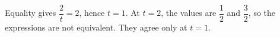 Equality gives $\dfrac{2}{t}=2$, hence $t=1$. At $t=2$, the values are $\dfrac{1}{2}$ and $\dfrac{3}{2}$, so the expressions are not equivalent. They agree only at $\boxed{t=1}$.
